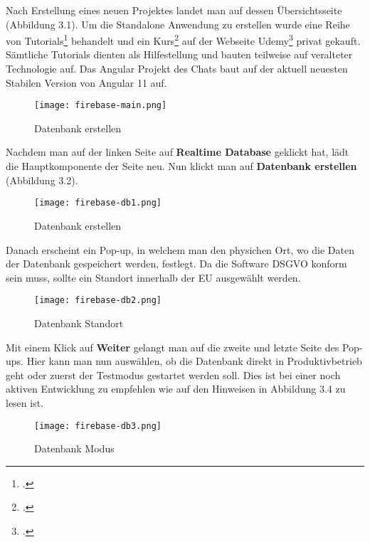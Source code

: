 Nach Erstellung eines neuen Projektes landet man auf dessen Übersichtsseite (Abbildung 3.1).
Um die Standalone Anwendung zu erstellen wurde eine Reihe von Tutorials\footcite{firebase-yt-tut} behandelt und ein Kurs\footcite{firebase-tut1} auf der Webseite Udemy\footcite{udemy-course} privat gekauft.
Sämtliche Tutorials dienten als Hilfestellung und bauten teilweise auf veralteter Technologie auf. Das Angular Projekt des Chats baut auf der aktuell neuesten Stabilen Version von Angular 11 auf.
\begin{center}
    \begin{figure}[H]
        \centering
        \texttt{[image: firebase-main.png]}
        \caption{Datenbank erstellen}
    \end{figure}
\end{center}
Nachdem man auf der linken Seite auf \textbf{Realtime Database} geklickt hat, lädt die Hauptkomponente der Seite neu. Nun klickt man auf \textbf{Datenbank erstellen} (Abbildung 3.2).
\begin{center}
    \begin{figure}[H]
        \centering
        \texttt{[image: firebase-db1.png]}
        \caption{Datenbank erstellen}
    \end{figure}
\end{center}
Danach erscheint ein Pop-up, in welchem man den physichen Ort, wo die Daten der Datenbank gespeichert werden, festlegt. Da die Software DSGVO konform sein muss, sollte ein Standort innerhalb der EU ausgewählt werden.
\begin{center}
    \begin{figure}[H]
        \centering
        \texttt{[image: firebase-db2.png]}
        \caption{Datenbank Standort}
    \end{figure}
\end{center}
Mit einem Klick auf \textbf{Weiter} gelangt man auf die zweite und letzte Seite des Pop-ups.
Hier kann man nun auswählen, ob die Datenbank direkt in Produktivbetrieb geht oder zuerst der Testmodus gestartet werden soll. Dies ist bei einer
noch aktiven Entwicklung zu empfehlen wie auf den Hinweisen in Abbildung 3.4 zu lesen ist.
\begin{center}
    \begin{figure}[H]
        \centering
        \texttt{[image: firebase-db3.png]}
        \caption{Datenbank Modus}
    \end{figure}
\end{center}
